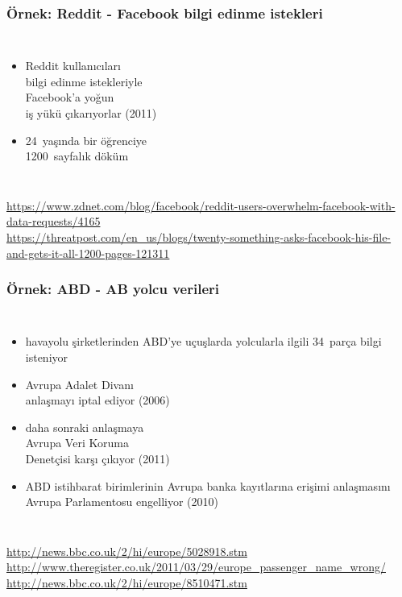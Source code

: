 \documentclass[dvipsnames]{beamer}
\theoremstyle{plain}
\begin{document}
\begin{frame}
  \frametitle{Örnek: Reddit - Facebook bilgi edinme istekleri}

  \begin{columns}

    \begin{itemize}
      \item Reddit kullanıcıları\\
        bilgi edinme istekleriyle\\
        Facebook'a yoğun\\
        iş yükü çıkarıyorlar (2011)
      \item 24~yaşında bir öğrenciye\\
        1200~sayfalık döküm
    \end{itemize}
  \end{columns}

  \medskip
  \tiny{\url{https://www.zdnet.com/blog/facebook/reddit-users-overwhelm-facebook-with-data-requests/4165}}\\
  \tiny{\url{https://threatpost.com/en_us/blogs/twenty-something-asks-facebook-his-file-and-gets-it-all-1200-pages-121311}}\\
\end{frame}

\begin{frame}
  \frametitle{Örnek: ABD - AB yolcu verileri}

  \begin{columns}

    \begin{itemize}
      \item havayolu şirketlerinden ABD'ye uçuşlarda yolcularla ilgili 34~parça
        bilgi isteniyor
      \item Avrupa Adalet Divanı\\
        anlaşmayı iptal ediyor (2006)
      \item daha sonraki anlaşmaya\\
        Avrupa Veri Koruma\\
        Denetçisi karşı çıkıyor (2011)

      \pause
      \item ABD istihbarat birimlerinin Avrupa banka kayıtlarına erişimi
        anlaşmasını Avrupa Parlamentosu engelliyor (2010)
    \end{itemize}
  \end{columns}

  \medskip
  \tiny{\url{http://news.bbc.co.uk/2/hi/europe/5028918.stm}}\\
  \tiny{\url{http://www.theregister.co.uk/2011/03/29/europe_passenger_name_wrong/}}\\
  \tiny{\url{http://news.bbc.co.uk/2/hi/europe/8510471.stm}}\\
\end{frame}
\end{document}
